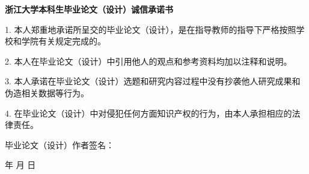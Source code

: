 \thispagestyle{empty}

{
\setlength{\parindent}{0em}
\renewcommand{\baselinestretch}{2}

\vspace*{1mm}

{
\centering
  \heiti\xiaosan\bfseries 浙江大学本科生毕业论文（设计）诚信承诺书 \par
}

\vspace{2em}

{
\songti\sihao
\setlength{\parindent}{2em}
1. 本人郑重地承诺所呈交的毕业论文（设计），是在指导教师的指导下严格按照学校和学院有关规定完成的。

2. 本人在毕业论文（设计）中引用他人的观点和参考资料均加以注释和说明。

3. 本人承诺在毕业论文（设计）选题和研究内容过程中没有抄袭他人研究成果和伪造相关数据等行为。


4. 在毕业论文（设计）中对侵犯任何方面知识产权的行为，由本人承担相应的法律责任。

\vspace{6em}

毕业论文（设计）作者签名：

\vspace{2em}

\begin{flushright}
  \underline{\hspace{4em}} 年 \underline{\hspace{2em}} 月 \underline{\hspace{2em}} 日
\end{flushright}
}
}
